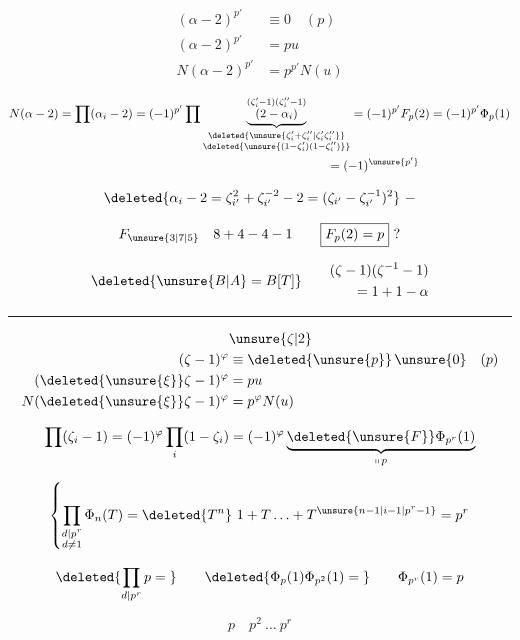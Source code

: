 
\[
\begin{aligned}
(\alpha-2)^{p'}&\equiv0\quad(p)\\
(\alpha-2)^{p'}&=pu\\
N(\alpha-2)^{p'}&=p^{p'}N(u)
\end{aligned}
\]

\[
\begin{aligned}
N(\alpha-2)&=\prod(\alpha_i-2)=(-1)^{p'}\prod
\underset{\substack{\deleted{\unsure{\zeta'_i+\zeta''_i|\zeta'_i\zeta''_i}}\\\deleted{\unsure{(1-\zeta'_i)(1-\zeta''_i)}}}}{\underbrace{\overset{(\zeta'_i-1)(\zeta''_i-1)}{(2-\alpha_i)}}}
=(-1)^{p'}F_p(2)=(-1)^{p'}\Phi_p(1)\\
&\hspace{22em}=(-1)^{\unsure{p'}}
\end{aligned}
\]

\[
\deleted{\alpha_i-2=\zeta_{i'}^2+\zeta_{i'}^{-2}-2=(\zeta_{i'}-\zeta_{i'}^{-1})^2}\ -
\]

\[
F_{\unsure{3|7|5}}\quad 8+4-4-1\qquad\boxed{F_p(2)=p}\ ?
\]

\[
\deleted{\unsure{B|A}=B[T]}\qquad
\begin{aligned}
(\zeta-1)(\zeta^{-1}-1)\\
=1+1-\alpha
\end{aligned}
\]


\begin{center}\rule{1.5cm}{.4pt}\end{center}

\[
\begin{aligned}
&\unsure{\zeta|2}\\
(\zeta-1)^\varphi&\equiv\deleted{\unsure{p}}\,\unsure{0}\quad(p)\\
(\deleted{\unsure{\xi}}\zeta-1)^\varphi&=pu\\
N(\deleted{\unsure{\xi}}\zeta-1)^\varphi&=p^\varphi N(u)
\end{aligned}
\]

\[
\prod(\zeta_i-1)=(-1)^\varphi\prod_i(1-\zeta_i)=(-1)^\varphi\underbrace{\deleted{\unsure{F}}\Phi_{p^r}(1)}_{\shortparallel\,p}
\]

\[
\left\{\prod_{\substack{d\mid p^r\\ d\ne1}}\Phi_n(T)=\deleted{T^n}\ 1+T\ldots+T^{\unsure{n-1|i-1|p^r-1}}=p^r\right.
\]

\[
\deleted{\prod_{d\mid p^r}p={}}\qquad\deleted{\Phi_p(1)\Phi_{p^2}(1)={}}\qquad\Phi_{p^r}(1)=p
\]

\[
p\quad p^2\ \ldots\ p^r
\]

